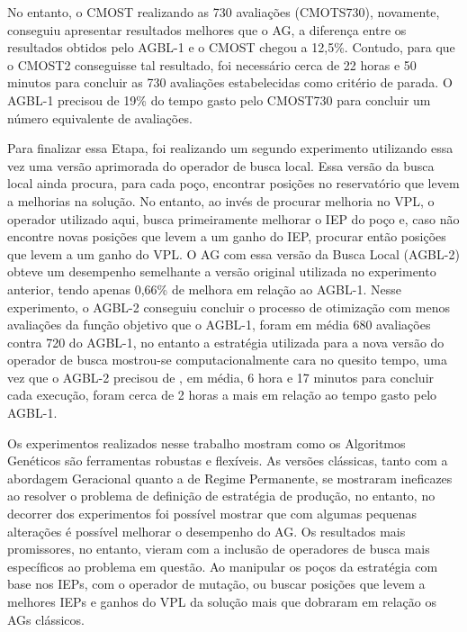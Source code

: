 No entanto, o CMOST realizando as 730 avaliações (CMOTS730), novamente, conseguiu apresentar resultados melhores que o AG, a diferença entre os resultados obtidos pelo AGBL-1 e o CMOST chegou a 12,5\%. Contudo, para que o CMOST2 conseguisse tal resultado, foi necessário cerca de 22 horas e 50 minutos para concluir as 730 avaliações estabelecidas como critério de parada. O AGBL-1 precisou de 19\% do tempo gasto pelo CMOST730 para concluir um número equivalente de avaliações.

Para finalizar essa Etapa, foi realizando um segundo experimento utilizando essa vez uma versão aprimorada do operador de busca local. Essa versão da busca local ainda procura, para cada poço, encontrar posições no reservatório que levem a melhorias na solução. No entanto, ao invés de procurar melhoria no VPL, o operador utilizado aqui, busca primeiramente melhorar o IEP do poço e, caso não encontre novas posições que levem a um ganho do IEP, procurar então posições que levem a um ganho do VPL. O AG com essa versão da Busca Local (AGBL-2) obteve um desempenho semelhante a versão original utilizada no experimento anterior, tendo apenas 0,66\% de melhora em relação ao AGBL-1.  Nesse experimento, o AGBL-2 conseguiu concluir o processo de otimização com menos avaliações da função objetivo que o AGBL-1, foram em média 680 avaliações contra 720 do AGBL-1, no entanto a estratégia utilizada para a nova versão do operador de busca mostrou-se computacionalmente cara no quesito tempo, uma vez que o AGBL-2 precisou de , em média, 6 hora e 17 minutos para concluir cada execução, foram cerca de 2 horas a mais em relação ao tempo gasto pelo AGBL-1.
 	
Os experimentos realizados nesse trabalho mostram como os Algoritmos Genéticos são ferramentas robustas e flexíveis. As versões clássicas, tanto com a abordagem Geracional quanto a de Regime Permanente, se mostraram ineficazes ao resolver o problema de definição de estratégia de produção, no entanto, no decorrer dos experimentos foi possível mostrar que com algumas pequenas alterações é possível melhorar o desempenho do AG. Os resultados mais promissores, no entanto, vieram com a inclusão de operadores de busca mais específicos ao problema em questão. Ao manipular os poços da estratégia com base nos IEPs, com o operador de mutação, ou buscar posições que levem a melhores IEPs e ganhos do VPL da solução mais que dobraram em relação os AGs clássicos.
 	
